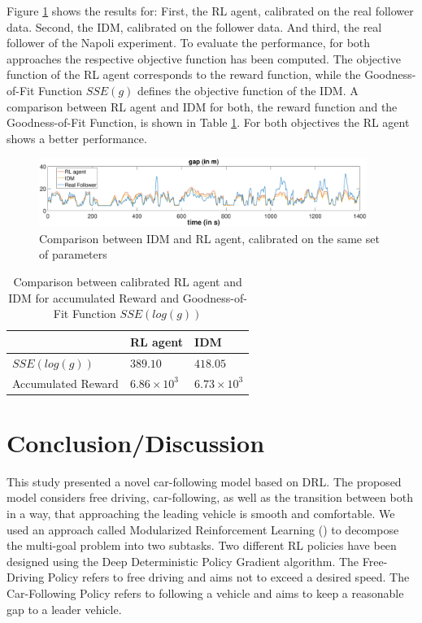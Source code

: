 \documentclass[review]{elsarticle}
\providecommand{\3}{{\ss}}
\begin{document}
Figure \ref{fig:IDMvsRL} shows the results for: First, the RL agent, calibrated on the real follower data. Second, the IDM, calibrated on the follower data. And third, the real follower of the Napoli experiment. To evaluate the performance, for both approaches the respective objective function has been computed. The objective function of the RL agent corresponds to the reward function, while the Goodness-of-Fit Function $SSE(g)$ defines the objective function of the IDM. A comparison between RL agent and IDM for both, the reward function and the Goodness-of-Fit Function, is shown in Table \ref{tab:objectiveFunc}. For both objectives the RL agent shows a better performance.

\begin{figure}
	
	\centering
	\includegraphics[width=0.95\textwidth]{images/IDMvsRL_dist}
	\caption{Comparison between IDM and RL agent, calibrated on the same set of parameters}
	\label{fig:IDMvsRL}
\end{figure}

\begin{table}
	\caption{Comparison between calibrated RL agent and IDM for accumulated Reward and Goodness-of-Fit Function $SSE(log(g))$} 
	\label{tab:objectiveFunc} 
	\begin{center}
		\begin{tabular}{p{} | p{} p{}  } 
			& RL agent & IDM   \\ \hline
			$SSE(log(g))$ & $389.10$ &  $418.05$	\\
			Accumulated Reward &  $6.86 \times 10^3$   & $6.73\times 10^3$
			
		\end{tabular}
	\end{center}
\end{table}


\section{Conclusion/Discussion}
This study presented a novel car-following model based on DRL. The proposed model considers free driving, car-following, as well as the transition between both in a way, that approaching the leading vehicle is smooth and comfortable. We used an approach called Modularized Reinforcement Learning (\cite{MRL}) to decompose the multi-goal problem into two subtasks. Two different RL policies have been designed using the Deep Deterministic Policy Gradient algorithm. The Free-Driving Policy refers to free driving and aims not to exceed a desired speed. The Car-Following Policy refers to following a vehicle and aims to keep a reasonable gap to a leader vehicle.
\end{document}
